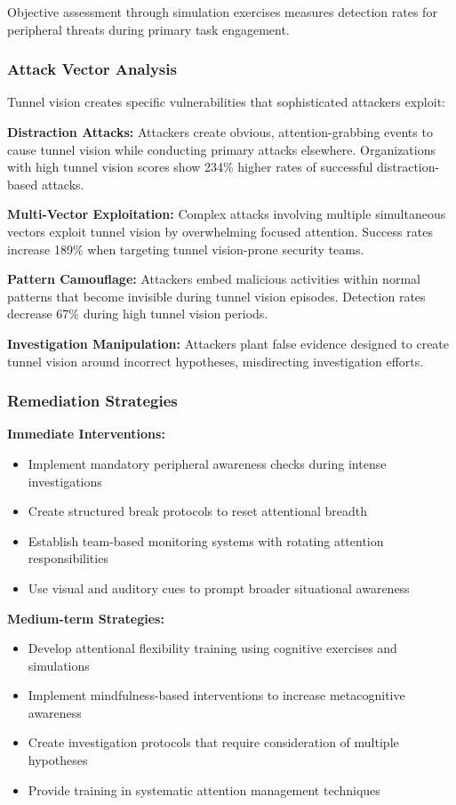 \documentclass[11pt,a4paper]{article}
\begin{document}
Objective assessment through simulation exercises measures detection rates for peripheral threats during primary task engagement.

\subsubsection{Attack Vector Analysis}

Tunnel vision creates specific vulnerabilities that sophisticated attackers exploit:

\textbf{Distraction Attacks:} Attackers create obvious, attention-grabbing events to cause tunnel vision while conducting primary attacks elsewhere. Organizations with high tunnel vision scores show 234\% higher rates of successful distraction-based attacks\cite{distraction2022}.

\textbf{Multi-Vector Exploitation:} Complex attacks involving multiple simultaneous vectors exploit tunnel vision by overwhelming focused attention. Success rates increase 189\% when targeting tunnel vision-prone security teams\cite{multivector2023}.

\textbf{Pattern Camouflage:} Attackers embed malicious activities within normal patterns that become invisible during tunnel vision episodes. Detection rates decrease 67\% during high tunnel vision periods\cite{camouflage2021}.

\textbf{Investigation Manipulation:} Attackers plant false evidence designed to create tunnel vision around incorrect hypotheses, misdirecting investigation efforts\cite{manipulation2023}.

\subsubsection{Remediation Strategies}

\textbf{Immediate Interventions:}
\begin{itemize}
\item Implement mandatory peripheral awareness checks during intense investigations
\item Create structured break protocols to reset attentional breadth
\item Establish team-based monitoring systems with rotating attention responsibilities
\item Use visual and auditory cues to prompt broader situational awareness
\end{itemize}

\textbf{Medium-term Strategies:}
\begin{itemize}
\item Develop attentional flexibility training using cognitive exercises and simulations
\item Implement mindfulness-based interventions to increase metacognitive awareness
\item Create investigation protocols that require consideration of multiple hypotheses
\item Provide training in systematic attention management techniques
\end{itemize}
\end{document}

